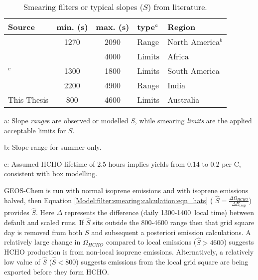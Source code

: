 \documentclass[acp, manuscript]{copernicus}
\newcommand{\textcite}{\citet}
\begin{document}
    \begin{table}\begin{threeparttable}
        \caption{Smearing filters or typical slopes ($S$) from literature.}
        \begin{tabular}{ l | c  c  l  >{\centering\arraybackslash}p{3cm} } 
          \toprule
          Source & min. (s) & max. (s) & type$^a$ & Region \\
          \midrule
          \textcite{Palmer2003}      & 1270 & 2090 & Range & North America$^{b}$ \\
          \textcite{Marais2012}      &      & 4000 & Limits & Africa \\
          \textcite{Barkley2013}$^c$ & 1300 & 1800 & Limits & South America \\
          \textcite{Surl2018}        & 2200 & 4900 & Range & India \\
          This Thesis             & 800  & 4600 & Limits & Australia \\
          \bottomrule
        \end{tabular}
        \begin{tablenotes}
          \small
          \item a: Slope \textit{range}s are observed or modelled $S$, while smearing \textit{limits} are the applied acceptable limits for $S$. 
          \item b: Slope range for summer only.
          \item c: Assumed HCHO lifetime of 2.5 hours implies yields from 0.14 to 0.2 per C, consistent with box modelling.
        \end{tablenotes}
        \label{Model:filter:smearing:tab_smearing_ranges}
      \end{threeparttable}\end{table}
      
      
      
      GEOS-Chem is run with normal isoprene emissions and with isoprene emissions halved, then Equation \ref{Model:filter:smearing:calculation:eqn_hats} ( $\hat{S} = \frac{\Delta \Omega_{HCHO}}{\Delta E_{isop}} $) provides $\hat{S}$.
      Here $\Delta$ represents the difference (daily 1300-1400~local time) between default and scaled runs.
      If $\hat{S}$ sits outside the 800-4600 range then that grid square day is removed from both $S$ and subsequent a posteriori emission calculations.
      A relatively large change in $\Omega_{HCHO}$ compared to local emissions ($\hat{S}>4600$) suggests HCHO production is from non-local isoprene emissions.
      Alternatively, a relatively low value of $\hat{S}$ ($\hat{S}<800$) suggests emissions from the local grid square are being exported before they form HCHO.
      
\end{document}
